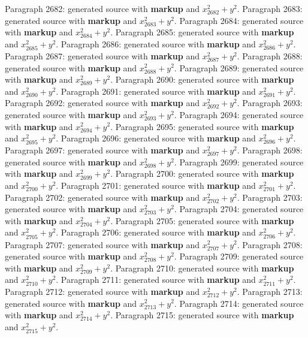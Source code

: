\documentclass{article}
\begin{document}
Paragraph 2682: generated source with \textbf{markup} and $x_{2682}^2 + y^2$.
Paragraph 2683: generated source with \textbf{markup} and $x_{2683}^2 + y^2$.
Paragraph 2684: generated source with \textbf{markup} and $x_{2684}^2 + y^2$.
Paragraph 2685: generated source with \textbf{markup} and $x_{2685}^2 + y^2$.
Paragraph 2686: generated source with \textbf{markup} and $x_{2686}^2 + y^2$.
Paragraph 2687: generated source with \textbf{markup} and $x_{2687}^2 + y^2$.
Paragraph 2688: generated source with \textbf{markup} and $x_{2688}^2 + y^2$.
Paragraph 2689: generated source with \textbf{markup} and $x_{2689}^2 + y^2$.
Paragraph 2690: generated source with \textbf{markup} and $x_{2690}^2 + y^2$.
Paragraph 2691: generated source with \textbf{markup} and $x_{2691}^2 + y^2$.
Paragraph 2692: generated source with \textbf{markup} and $x_{2692}^2 + y^2$.
Paragraph 2693: generated source with \textbf{markup} and $x_{2693}^2 + y^2$.
Paragraph 2694: generated source with \textbf{markup} and $x_{2694}^2 + y^2$.
Paragraph 2695: generated source with \textbf{markup} and $x_{2695}^2 + y^2$.
Paragraph 2696: generated source with \textbf{markup} and $x_{2696}^2 + y^2$.
Paragraph 2697: generated source with \textbf{markup} and $x_{2697}^2 + y^2$.
Paragraph 2698: generated source with \textbf{markup} and $x_{2698}^2 + y^2$.
Paragraph 2699: generated source with \textbf{markup} and $x_{2699}^2 + y^2$.
Paragraph 2700: generated source with \textbf{markup} and $x_{2700}^2 + y^2$.
Paragraph 2701: generated source with \textbf{markup} and $x_{2701}^2 + y^2$.
Paragraph 2702: generated source with \textbf{markup} and $x_{2702}^2 + y^2$.
Paragraph 2703: generated source with \textbf{markup} and $x_{2703}^2 + y^2$.
Paragraph 2704: generated source with \textbf{markup} and $x_{2704}^2 + y^2$.
Paragraph 2705: generated source with \textbf{markup} and $x_{2705}^2 + y^2$.
Paragraph 2706: generated source with \textbf{markup} and $x_{2706}^2 + y^2$.
Paragraph 2707: generated source with \textbf{markup} and $x_{2707}^2 + y^2$.
Paragraph 2708: generated source with \textbf{markup} and $x_{2708}^2 + y^2$.
Paragraph 2709: generated source with \textbf{markup} and $x_{2709}^2 + y^2$.
Paragraph 2710: generated source with \textbf{markup} and $x_{2710}^2 + y^2$.
Paragraph 2711: generated source with \textbf{markup} and $x_{2711}^2 + y^2$.
Paragraph 2712: generated source with \textbf{markup} and $x_{2712}^2 + y^2$.
Paragraph 2713: generated source with \textbf{markup} and $x_{2713}^2 + y^2$.
Paragraph 2714: generated source with \textbf{markup} and $x_{2714}^2 + y^2$.
Paragraph 2715: generated source with \textbf{markup} and $x_{2715}^2 + y^2$.
\end{document}
